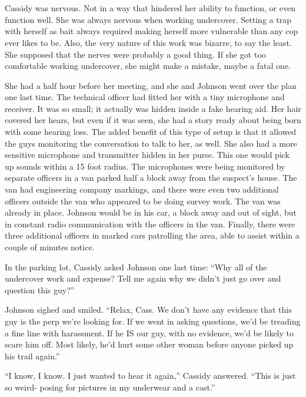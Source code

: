 \chapter{~}
Cassidy was nervous. Not in a way that hindered her ability to function, or even function
well. She was always nervous when working undercover. Setting a trap with herself as bait always
required making herself more vulnerable than any cop ever likes to be. Also, the very nature of
this work was bizarre, to say the least. She supposed that the nerves were probably a good
thing. If she got too comfortable working undercover, she might make a mistake, maybe a fatal
one.

She had a half hour before her meeting, and she and Johnson went over the plan one last
time. The technical officer had fitted her with a tiny microphone and receiver. It was so small;
it actually was hidden inside a fake hearing aid. Her hair covered her hears, but even if it was
seen, she had a story ready about being born with some hearing loss. The added benefit of this
type of setup is that it allowed the guys monitoring the conversation to talk to her, as well.
She also had a more sensitive microphone and transmitter hidden in her purse. This one would
pick up sounds within a 15 foot radius. The microphones were being monitored by separate
officers in a van parked half a block away from the suspect's house. The van had engineering
company markings, and there were even two additional officers outside the van who appeared to be
doing survey work. The van was already in place. Johnson would be in his car, a block away and
out of sight, but in constant radio communication with the officers in the van. Finally, there
were three additional officers in marked cars patrolling the area, able to assist within a
couple of minutes notice.

In the parking lot, Cassidy asked Johnson one last time: ``Why all of the undercover work
and expense? Tell me again why we didn't just go over and question this guy?''

Johnson sighed and smiled. ``Relax, Cass. We don't have any evidence that this guy is the
perp we're looking for. If we went in asking questions, we'd be treading a fine line with
harassment. If he IS our guy, with no evidence, we'd be likely to scare him off. Most likely,
he'd hurt some other woman before anyone picked up his trail again.''

``I know, I know. I just wanted to hear it again,'' Cassidy answered. ``This is just so
weird- posing for pictures in my underwear and a cast.''

